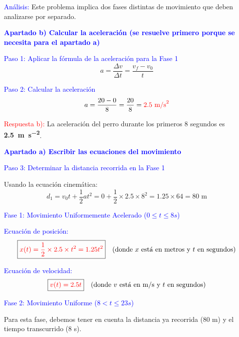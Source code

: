 \begin{exercise}
\begin{solu}
        \textcolor{blue}{Análisis:} Este problema implica dos fases distintas de movimiento que deben analizarse por separado.

        \vspace{0.3cm}

        \textbf{\textcolor{blue}{Apartado b) Calcular la aceleración (se resuelve primero porque se necesita para el apartado a)}}

        \textcolor{blue}{Paso 1: Aplicar la fórmula de la aceleración para la Fase 1}
        \[
            \boxed{a = \frac{\Delta v}{\Delta t} = \frac{v_f - v_0}{t}}
        \]

        \textcolor{blue}{Paso 2: Calcular la aceleración}
        \[
            a = \frac{20 - 0}{8} = \frac{20}{8} = \textcolor{red}{2.5 \text{ m/s}^2}
        \]

        \textcolor{red}{Respuesta b):} La aceleración del perro durante los primeros 8 segundos es \textbf{\qty{2.5}{\metre\per\second\squared}}.

        \vspace{0.5cm}

        \textbf{\textcolor{blue}{Apartado a) Escribir las ecuaciones del movimiento}}

        \textcolor{blue}{Paso 3: Determinar la distancia recorrida en la Fase 1}

        Usando la ecuación cinemática:
        \[
            d_1 = v_0 t + \frac{1}{2}at^2 = 0 + \frac{1}{2} \times 2.5 \times 8^2 = 1.25 \times 64 = 80 \text{ m}
        \]

        \textcolor{blue}{Fase 1: Movimiento Uniformemente Acelerado ($0 \leq t \leq 8 s$)}

        \textcolor{blue}{Ecuación de posición:}
        \[
            \boxed{\textcolor{red}{x(t) = \frac{1}{2} \times 2.5 \times t^2 = 1.25t^2}} \quad \text{(donde $x$ está en metros y $t$ en segundos)}
        \]

        \textcolor{blue}{Ecuación de velocidad:}
        \[
            \boxed{\textcolor{red}{v(t) = 2.5t}} \quad \text{(donde $v$ está en m/s y $t$ en segundos)}
        \]

        \vspace{0.3cm}

        \textcolor{blue}{Fase 2: Movimiento Uniforme ($8 < t \leq 23 s$)}

        Para esta fase, debemos tener en cuenta la distancia ya recorrida (80 m) y el tiempo transcurrido (8 s).


\end{solu}
\end{exercise}
